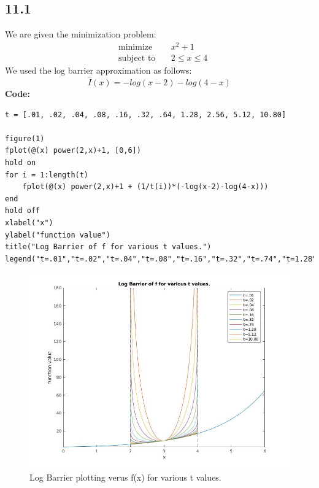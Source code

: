 \documentclass[12pt]{article}
\begin{document}
\subsection*{11.1}
We are given the minimization problem:
\begin{equation*}
\begin{aligned}
& \underset{}{\text{minimize}}
& &x^2 + 1\\
& \text{subject to}\
& & 2 \le x \le 4
\end{aligned}
\end{equation*}
We used the log barrier approximation as follows:
$$\hat{I}(x) = -log(x-2) - log(4-x)$$
\textbf{Code:}
\begin{lstlisting}
t = [.01, .02, .04, .08, .16, .32, .64, 1.28, 2.56, 5.12, 10.80]

figure(1)
fplot(@(x) power(2,x)+1, [0,6])
hold on
for i = 1:length(t)
    fplot(@(x) power(2,x)+1 + (1/t(i))*(-log(x-2)-log(4-x)))
end
hold off
xlabel("x")
ylabel("function value")
title("Log Barrier of f for various t values.")
legend("t=.01","t=.02","t=.04","t=.08","t=.16","t=.32","t=.74","t=1.28","t=5.
\end{lstlisting}
\begin{figure}[ht]
    \centering
    \includegraphics[width=\textwidth]{log_barrier.jpg}
    \caption{Log Barrier plotting verus f(x) for various t values.}
\end{figure}
\break
\end{document}
